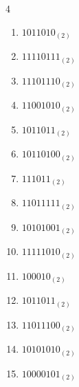 \begin{multicols}{4}
\begin{enumerate}
        \phantom{$=133$}

  \item $1011010_{(2)}$

        \phantom{$=90$}

\columnbreak %

  \item $11110111_{(2)}$

        \phantom{$=247$}

  \item $11101110_{(2)}$

        \phantom{$=238$}

  \item $11001010_{(2)}$

        \phantom{$=202$}

  \item $1011011_{(2)}$

        \phantom{$=91$}

  \item $10110100_{(2)}$

        \phantom{$=180$}

  \item $111011_{(2)}$

        \phantom{$=59$}

  \item $11011111_{(2)}$

        \phantom{$=223$}

  \item $10101001_{(2)}$

        \phantom{$=169$}

  \item $11111010_{(2)}$

        \phantom{$=250$}

  \item $100010_{(2)}$

        \phantom{$=34$}

  \item $1011011_{(2)}$

        \phantom{$=91$}

  \item $11011100_{(2)}$

        \phantom{$=220$}

  \item $10101010_{(2)}$

        \phantom{$=170$}

  \item $10000101_{(2)}$


\end{enumerate}
\end{multicols}
